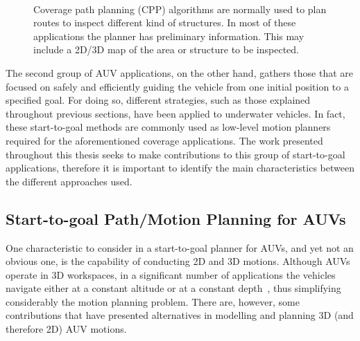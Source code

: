 \begin{figure}[htbp]
    \myfloatalign
     \\
\caption[Coverage path planning (CPP) applications.]
{Coverage path planning (CPP) algorithms are normally used to plan routes to
inspect different kind of structures. In most of these applications the planner
has preliminary information. This may include a 2D/3D map of the area or
structure to be inspected.}
\label{fig:CPP-App}
\end{figure}

The second group of \ac{AUV} applications, on the other hand, gathers those that
are focused on safely and efficiently guiding the vehicle from one initial
position to a specified goal. For doing so, different strategies, such as those
explained throughout previous sections, have been applied to underwater
vehicles. In fact, these start-to-goal methods are commonly used as low-level
motion planners required for the aforementioned coverage applications. The work
presented throughout this thesis seeks to make contributions to this group of
start-to-goal applications, therefore it is important to identify the main
characteristics between the different approaches used.

\subsection{Start-to-goal Path/Motion Planning for AUVs}

One characteristic to consider in a start-to-goal planner for \acp{AUV}, and yet
not an obvious one, is the capability of conducting \ac{2D} and \ac{3D} motions.
Although \acp{AUV} operate in \ac{3D} workspaces, in a significant number of
applications the vehicles navigate either at a constant altitude or at a
constant depth~\cite{Petillot2001,Poppinga2011,Soulignac2011,McMahon2016}, thus
simplifying considerably the motion planning problem. There are, however, some
contributions that have presented alternatives in modelling and planning \ac{3D}
(and therefore \ac{2D}) \ac{AUV} motions.

